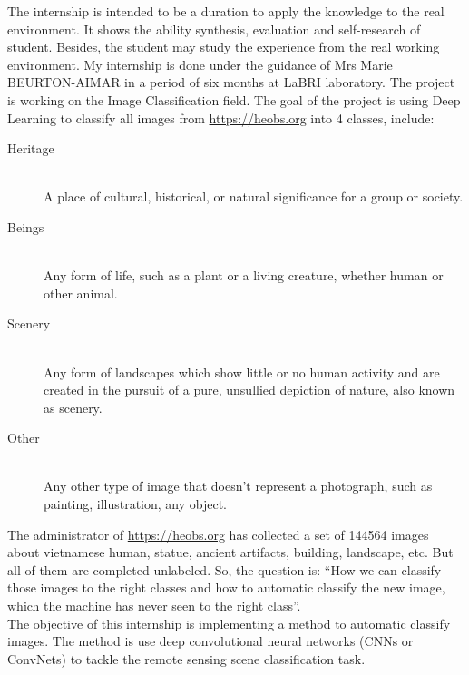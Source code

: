 \documentclass[hidelinks,12pt,a4paper]{report}
\begin{document}
The internship is intended to be a duration to apply the knowledge to the real environment. It shows the ability synthesis, evaluation and self-research of student. Besides, the student may study the experience from the real working environment. My internship is done under the
guidance of Mrs Marie BEURTON-AIMAR in a period of six months at LaBRI laboratory.
The project is working on the Image Classification field. The goal of the project is using Deep Learning to classify all images from \href{https://heobs.org}{https://heobs.org} into 4 classes, include:
\begin{description}
\item[Heritage] \hfill \\ A place of cultural, historical, or natural significance for a group or society.
\item[Beings] \hfill \\ Any form of life, such as a plant or a living creature, whether human or other animal.
\item[Scenery] \hfill \\ Any form of landscapes which show little or no human activity and are created in the pursuit of a pure, unsullied depiction of nature, also known as scenery.
\item[Other] \hfill \\ Any other type of image that doesn't represent a photograph, such as painting, illustration, any object.	
\end{description}
The administrator of \href{https://heobs.org}{https://heobs.org} has collected a set of 144564 images about vietnamese human, statue, ancient artifacts, building, landscape, etc. But all of them are completed unlabeled. So, the question is: ``How we can classify those images to the right classes and how to automatic classify the new image, which the machine has never seen to the right class''.\\
The objective of this internship is implementing a method to automatic classify images.
The method is use deep convolutional neural networks (CNNs or ConvNets) to tackle the remote sensing scene classification task.
\end{document}
